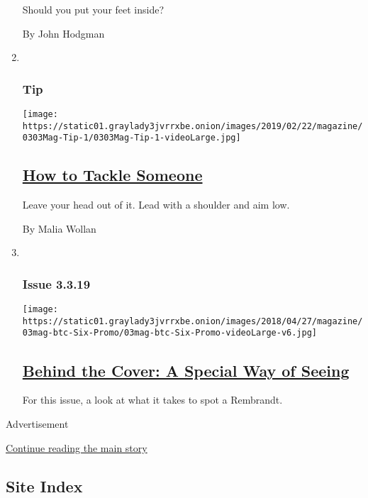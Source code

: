 \begin{enumerate}
  Should you put your feet inside?

  By John Hodgman
\item ~
  \hypertarget{tip}{%
  \subsubsection{Tip}\label{tip}}

  \texttt{[image: https://static01.graylady3jvrrxbe.onion/images/2019/02/22/magazine/0303Mag-Tip-1/0303Mag-Tip-1-videoLarge.jpg]}

  \hypertarget{how-to-tackle-someone}{%
  \subsection{\texorpdfstring{\href{/2019/02/26/magazine/how-to-tackle-someone.html}{How
  to Tackle
  Someone}}{How to Tackle Someone}}\label{how-to-tackle-someone}}

  Leave your head out of it. Lead with a shoulder and aim low.

  By Malia Wollan
\item ~
  \hypertarget{issue-3319}{%
  \subsubsection{Issue 3.3.19}\label{issue-3319}}

  \texttt{[image: https://static01.graylady3jvrrxbe.onion/images/2018/04/27/magazine/03mag-btc-Six-Promo/03mag-btc-Six-Promo-videoLarge-v6.jpg]}

  \hypertarget{behind-the-cover-a-special-way-of-seeing}{%
  \subsection{\texorpdfstring{\href{/2019/03/01/magazine/behind-the-cover-a-special-way-of-seeing.html}{Behind
  the Cover: A Special Way of
  Seeing}}{Behind the Cover: A Special Way of Seeing}}\label{behind-the-cover-a-special-way-of-seeing}}

  For this issue, a look at what it takes to spot a Rembrandt.
\end{enumerate}

Advertisement

\protect\hyperlink{after-mid1}{Continue reading the main story}

\hypertarget{site-index}{%
\subsection{Site Index}\label{site-index}}

